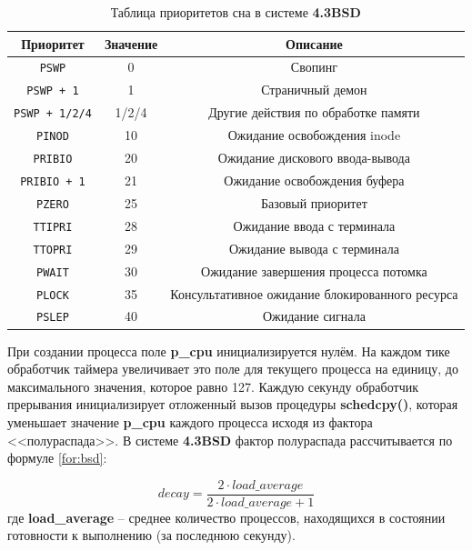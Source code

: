 \documentclass[a4paper,12pt]{extreport}
\begin{document}
\begin{table}[H]
	\caption{Таблица приоритетов сна в системе \textbf{4.3BSD}}
	\label{tab:bsd}
	\begin{center}
		\begin{tabular}{ |c|c|c|  }
			\hline
			\textbf{Приоритет} & \textbf{Значение} & \textbf{Описание} \\
			\hline
			\texttt{PSWP} & 0 & Свопинг \\
			\hline
			\texttt{PSWP + 1} & 1 & Страничный демон \\
			\hline
			\texttt{PSWP + 1/2/4} & 1/2/4 & Другие действия по обработке памяти \\
			\hline
			\texttt{PINOD} & 10 & Ожидание освобождения inode \\
			\hline
			\texttt{PRIBIO} & 20 & Ожидание дискового ввода-вывода \\
			\hline
			\texttt{PRIBIO + 1} & 21 & Ожидание освобождения буфера \\
			\hline
			\texttt{PZERO} & 25 & Базовый приоритет \\
			\hline
			\texttt{TTIPRI} & 28 & Ожидание ввода с терминала \\
			\hline
			\texttt{TTOPRI} & 29 & Ожидание вывода с терминала \\
			\hline 
			\texttt{PWAIT} & 30 & Ожидание завершения процесса потомка \\
			\hline
			\texttt{PLOCK} & 35 & Консультативное ожидание блокированного ресурса \\
			\hline
			\texttt{PSLEP} & 40 & Ожидание сигнала \\
			\hline
		\end{tabular}
	\end{center}
\end{table}

При создании процесса поле \textbf{p\_cpu} инициализируется нулём. На каждом тике обработчик таймера увеличивает это поле для текущего процесса на единицу, до максимального значения, которое равно 127. Каждую секунду обработчик прерывания инициализирует отложенный вызов процедуры \textbf{schedcpy()}, которая уменьшает значение \textbf{p\_cpu} каждого процесса исходя из фактора <<полураспада>>. В системе \textbf{4.3BSD} фактор полураспада рассчитывается по формуле \eqref{for:bsd}: 

\begin{equation}
	\label{for:bsd}
	decay = \frac{2 \cdot load\_average}{2 \cdot load\_average + 1}
\end{equation}
где \textbf{load\_average} -- среднее количество процессов, находящихся в состоянии готовности к выполнению (за последнюю секунду).
\end{document}
